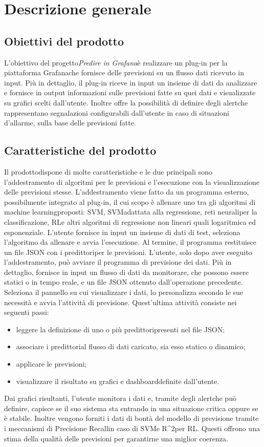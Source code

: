 \section{Descrizione generale}
	\subsection{Obiettivi del prodotto}
	L'obiettivo del progetto\glosp \textit{Predire in Grafana}\glosp è realizzare un plug-in per la piattaforma Grafana\glosp che fornisce delle previsioni su un flusso dati ricevuto in input.
	Più in dettaglio, il plug-in riceve in input un insieme di dati da analizzare e fornisce in output informazioni sulle previsioni fatte su quei dati e visualizzate su grafici scelti dall'utente. Inoltre offre la possibilità di definire degli alert\glosp che rappresentano segnalazioni configurabili dall'utente in caso di situazioni d'allarme, sulla base delle previsioni fatte. 
	\subsection{Caratteristiche del prodotto}
	Il prodotto\glosp dispone di molte caratteristiche e le due principali sono l'addestramento di algoritmi per le previsioni e l'esecuzione con la visualizzazione delle previsioni stesse.
	L'addestramento viene fatto da un programma esterno, possibilmente integrato al plug-in, il cui scopo è allenare uno tra gli algoritmi di machine learning\glosp proposti: SVM\glo, SVM\glosp adattata alla regressione, reti neurali\glosp per la classificazione, RL\glosp e altri algoritmi di regressione non lineari quali logaritmica ed esponenziale. L'utente fornisce in input un insieme di dati di test, seleziona l'algoritmo da allenare e avvia l'esecuzione. Al termine, il programma restituisce un file JSON con i predittori\glosp per le previsioni.
	L'utente, solo dopo aver eseguito l'addestramento, può avviare il programma di previsione dei dati. Più in dettaglio, fornisce in input un flusso di dati da monitorare, che possono essere statici o in tempo reale, e un file JSON ottenuto dall'operazione precedente. Seleziona il pannello su cui visualizzare i dati, lo personalizza secondo le sue necessità e avvia l'attività di previsione. Quest'ultima attività consiste nei seguenti passi:
	\begin{itemize}
		\item leggere la definizione di uno o più predittori\glosp presenti nel file JSON;
		\item associare i predittori\glosp al flusso di dati caricato, sia esso statico o dinamico;
		\item applicare le previsioni;
		\item visualizzare il risultato su grafici e dashboard\glosp definite dall'utente.
	\end{itemize}
	Dai grafici risultanti, l'utente monitora i dati e, tramite degli alert\glosp che può definire, capisce se il suo sistema sta entrando in una situazione critica oppure se è stabile.
	Inoltre vengono forniti i dati di bontà del modello di previsione tramite i meccanismi di Precision\glosp e Recall\glosp in caso di SVM\glosp e R\^{}2\glosp per RL\glo. Questi offrono una stima della qualità delle previsioni per garantirne una miglior coerenza.
